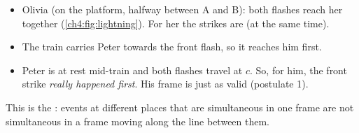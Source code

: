 \begin{sidebyside}[0.5]
  \label{ch4:fig:lightning}
\nextside
  \begin{itemize}
    \item Olivia (on the platform, halfway between A and B): both flashes reach her together
          (\cref{ch4:fig:lightning}). For her the strikes are  (at the same
          time).
    \item The train carries Peter towards the front flash, so it reaches him first.
    \item Peter is at rest mid-train and both flashes travel at $c$. So, for him, the front
          strike \emph{really happened first}. His frame is just as valid (postulate 1).
  \end{itemize}
\end{sidebyside}
This is the : events at different places that are simultaneous
in one frame are not simultaneous in a frame moving along the line between them.

